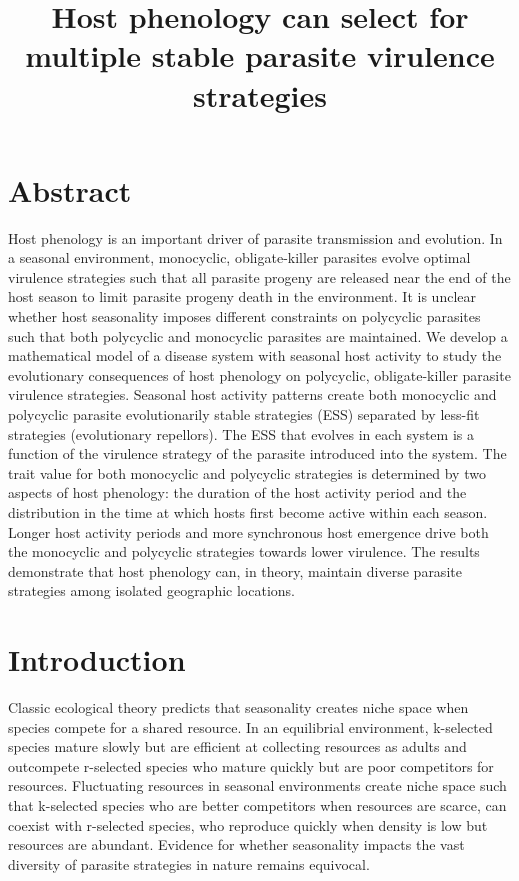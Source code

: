 \documentclass{article}
\title{Host phenology can select for multiple stable parasite virulence strategies}
\date{}
\begin{document}
\maketitle

\section*{Abstract}
Host phenology is an important driver of parasite transmission and evolution. In a seasonal environment, monocyclic, obligate-killer parasites evolve optimal virulence strategies such that all parasite progeny are released near the end of the host season to limit parasite progeny death in the environment. It is unclear whether host seasonality imposes different constraints on polycyclic parasites such that both polycyclic and monocyclic parasites are maintained. We develop a mathematical model of a disease system with seasonal host activity to study the evolutionary consequences of host phenology on polycyclic, obligate-killer parasite virulence strategies. Seasonal host activity patterns create both monocyclic and polycyclic parasite evolutionarily stable strategies (ESS) separated by less-fit strategies (evolutionary repellors). The ESS that evolves in each system is a function of the virulence strategy of the parasite introduced into the system. The trait value for both monocyclic and polycyclic strategies is determined by two aspects of host phenology: the duration of the host activity period and the distribution in the time at which hosts first become active within each season. Longer host activity periods and more synchronous host emergence drive both the monocyclic and polycyclic strategies towards lower virulence. The results demonstrate that host phenology can, in theory, maintain diverse parasite strategies among isolated geographic locations.




\section*{Introduction}
Classic ecological theory predicts that seasonality creates niche space when species compete for a shared resource. In an equilibrial environment, k-selected species mature slowly but are efficient at collecting resources as adults and outcompete r-selected species who mature quickly but are poor competitors for resources\cite{tilman2020resource}. Fluctuating resources in seasonal environments create niche space such that k-selected species who are better competitors when resources are scarce, can coexist with r-selected species, who reproduce quickly when density is low but resources are abundant\cite{koch1974competitive,armstrong1980competitive,litchman2001competition,klausmeier2008floquet}. Evidence for whether seasonality impacts the vast diversity of parasite strategies in nature remains equivocal.
\end{document}
